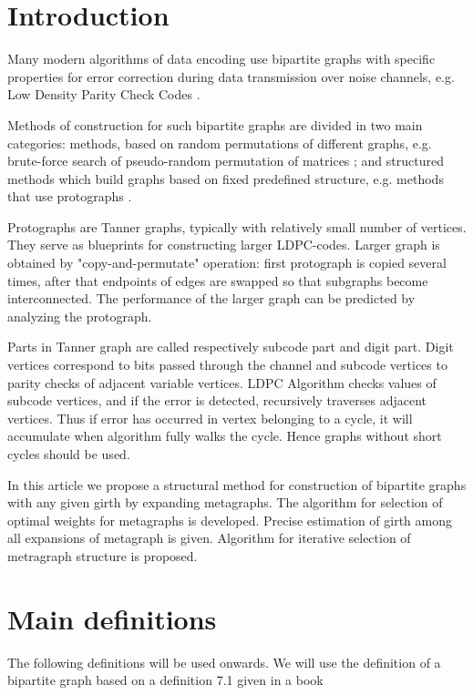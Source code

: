 \documentclass[14pt]{mmcs-article}
\newcounter{definition}[section]
\begin{document}
\renewcommand{\mod}[1]{\textrm{mod}\ #1}

\section{Introduction}

Many modern algorithms of data encoding use bipartite graphs with specific properties for error correction during data transmission over noise channels, e.g. Low Density Parity Check Codes \cite{LDPC}. 

Methods of construction for such bipartite graphs are divided in two main categories: methods, based on random permutations of different graphs, e.g. brute-force search \cite{bruteforce} of pseudo-random permutation of matrices \cite{gallager}; and structured methods which build graphs based on fixed predefined structure, e.g. methods that use protographs \cite{protographs}.

Protographs are Tanner graphs, typically with relatively small number of vertices. They serve as blueprints for constructing larger LDPC-codes. Larger graph is obtained by "copy-and-permutate" operation: first protograph is copied several times, after that endpoints of edges are swapped so that subgraphs become interconnected. The performance of the larger graph can be predicted by analyzing the protograph. 

Parts in Tanner graph are called respectively subcode part and digit part. Digit vertices correspond to bits passed through the channel and subcode vertices to parity checks of adjacent variable vertices. LDPC Algorithm checks values of subcode vertices, and if the error is detected, recursively traverses adjacent vertices. Thus if error has occurred in vertex belonging to a cycle, it will accumulate when algorithm fully walks the cycle. Hence graphs without short cycles should be used.

In this article we propose a structural method for construction of bipartite graphs with any given girth by expanding metagraphs. The algorithm for selection of optimal weights for metagraphs is developed. Precise estimation of girth among all expansions of metagraph is given. Algorithm for iterative selection of metragraph structure is proposed.

\section{Main definitions}

The following definitions will be used onwards. We will use the definition of a bipartite graph based on a definition 7.1 given in a book %
\end{document}

